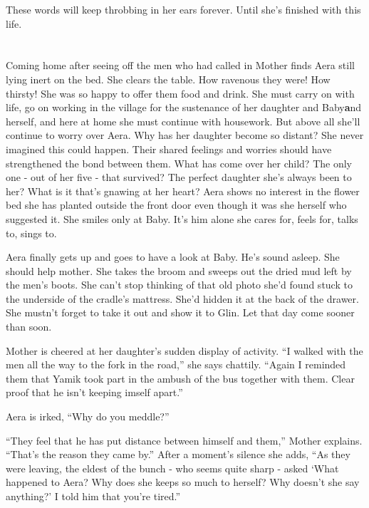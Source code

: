 \documentclass[twoside,11pt]{book}
\begin{document}
These words will keep throbbing in her ears forever. Until she's finished with this life.


\bigskip

\chapter{}

Coming home after seeing off the men who had called in Mother finds Aera still lying inert on the bed. She clears the
table. How ravenous they were! How thirsty! She was so happy to offer them food and drink. She must carry on with life,
go on working in the village for the sustenance of her daughter and Baby\textbf and herself, and here at home she
must continue with housework. But above all she'll continue to worry over Aera. Why has her daughter
become so distant? She never imagined this could happen.  Their shared feelings and worries should have strengthened
the bond between them. What has come over her child? The only one - out of her five - that survived? The perfect
daughter she's always been to her? What is it that's gnawing at her heart?  Aera shows no interest in the flower bed
she has planted outside the front door even though it was she herself who suggested it.  She smiles only at Baby. It's
him alone she cares for, feels for, talks to, sings to.

Aera finally gets up and goes to have a look at Baby. He's sound asleep. She should help mother. She takes the broom and
sweeps out the dried mud left by the men's boots. She can't stop thinking of that old photo she'd found stuck
to the underside of the cradle's mattress. She'd hidden it at the back of the drawer. She mustn't
forget to take it out and show it to Glin. Let that day come sooner than soon.

Mother is cheered at her daughter's sudden display of activity. ``I walked with the men all the way to the
fork in the road,'' she says chattily. ``Again I reminded them that Yamik took part in the
ambush of the bus together with them. Clear proof that he isn't keeping imself apart.''

Aera is irked, ``Why do you meddle?''

``They feel that he has put distance between himself and them,'' Mother explains.
``That's the reason they came by.'' After a moment's silence she adds, ``As they
were leaving, the eldest of the bunch - who seems quite sharp - asked `What happened to Aera? Why does she keeps so
much to herself? Why doesn't she say anything?' I told him that you're tired.''
\end{document}
